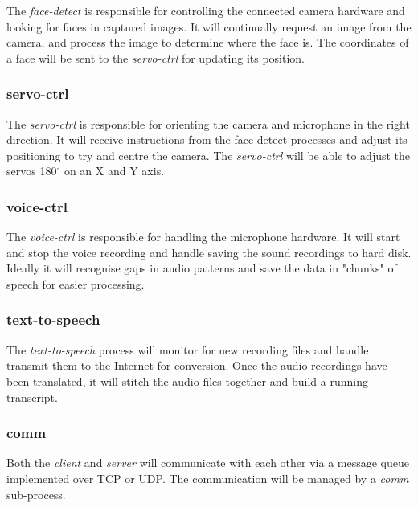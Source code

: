 \documentclass[11pt,a4paper,titlepage]{report}
\begin{document}
The \textit{face-detect} is responsible for controlling the connected camera hardware and looking for faces in captured images. It will continually request an image from the camera, and process the image to determine where the face is. The coordinates of a face will be sent to the \textit{servo-ctrl} for updating its position.


\subsubsection{servo-ctrl}

The \textit{servo-ctrl} is responsible for orienting the camera and microphone in the right direction. It will receive instructions from the face detect processes and adjust its positioning to try and centre the camera. The \textit{servo-ctrl} will be able to adjust the servos 180$^\circ$ on an X and Y axis.


\subsubsection{voice-ctrl}

The \textit{voice-ctrl} is responsible for handling the microphone hardware. It will start and stop the voice recording and handle saving the sound recordings to hard disk. Ideally it will recognise gaps in audio patterns and save the data in "chunks" of speech for easier processing. 



\subsubsection{text-to-speech}

The \textit{text-to-speech} process will monitor for new recording files and handle transmit them to the Internet for conversion. Once the audio recordings have been translated, it will stitch the audio files together and build a running transcript.


\subsubsection{comm}

Both the \textit{client} and \textit{server} will communicate with each other via a message queue implemented over TCP or UDP. The communication will be managed by a \textit{comm} sub-process.
\end{document}
